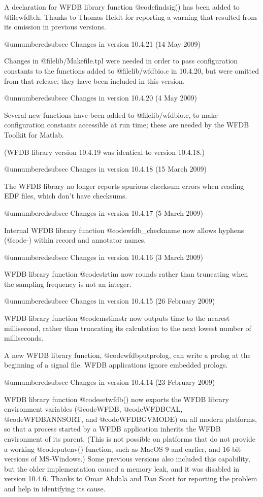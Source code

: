 {{{{{{{{A declaration for WFDB library function @code{findsig()} has been added
to @file{wfdb.h}.  Thanks to Thomas Heldt for reporting a warning that
resulted from its omission in previous versions.

@unnumberedsubsec Changes in version 10.4.21 (14 May 2009)

Changes in @file{lib/Makefile.tpl} were needed in order to pass configuration
constants to the functions added to @file{lib/wfdbio.c} in 10.4.20, but were
omitted from that release; they have been included in this version.

@unnumberedsubsec Changes in version 10.4.20 (4 May 2009)

Several new functions have been added to @file{lib/wfdbio.c}, to make
configuration constants accessible at run time; these are needed by
the WFDB Toolkit for Matlab.

(WFDB library version 10.4.19 was identical to version 10.4.18.)

@unnumberedsubsec Changes in version 10.4.18 (15 March 2009)

The WFDB library no longer reports spurious checksum errors when reading
EDF files, which don't have checksums.

@unnumberedsubsec Changes in version 10.4.17 (5 March 2009)

Internal WFDB library function @code{wfdb_checkname} now allows hyphens
(@code{-}) within record and annotator names.

@unnumberedsubsec Changes in version 10.4.16 (3 March 2009)

WFDB library function @code{strtim} now rounds rather than truncating when
the sampling frequency is not an integer.

@unnumberedsubsec Changes in version 10.4.15 (26 February 2009)

WFDB library function @code{mstimstr} now outputs time to the nearest
millisecond, rather than truncating its calculation to the next lowest number
of milliseconds.

A new WFDB library function, @code{wfdbputprolog}, can write a prolog at the
beginning of a signal file.  WFDB applications ignore embedded prologs.

@unnumberedsubsec Changes in version 10.4.14 (23 February 2009)

WFDB library function @code{setwfdb()} now exports the WFDB library
environment variables (@code{WFDB}, @code{WFDBCAL},
@code{WFDBANNSORT,} and @code{WFDBGVMODE}) on all modern platforms, so
that a process started by a WFDB application inherits the WFDB
environment of its parent.  (This is not possible on platforms that do
not provide a working @code{putenv()} function, such as MacOS 9 and
earlier, and 16-bit versions of MS-Windows.)  Some previous versions
also included this capability, but the older implementation caused a
memory leak, and it was disabled in version 10.4.6.  Thanks to Omar
Abdala and Dan Scott for reporting the problem and help in identifying
its cause.

}}}}}}}}
